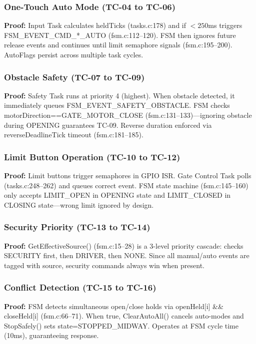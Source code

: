 \documentclass[11pt,a4paper]{article}
\begin{document}
\subsubsection{One-Touch Auto Mode (TC-04 to TC-06)}

\textbf{Proof:} Input Task calculates heldTicks (tasks.c:178) and if $< 250$ms triggers FSM\_EVENT\_CMD\_*\_AUTO (fsm.c:112--120). FSM then ignores future release events and continues until limit semaphore signals (fsm.c:195--200). AutoFlags persist across multiple task cycles.

\subsubsection{Obstacle Safety (TC-07 to TC-09)}

\textbf{Proof:} Safety Task runs at priority 4 (highest). When obstacle detected, it immediately queues FSM\_EVENT\_SAFETY\_OBSTACLE. FSM checks motorDirection==GATE\_MOTOR\_CLOSE (fsm.c:131--133)---ignoring obstacle during OPENING guarantees TC-09. Reverse duration enforced via reverseDeadlineTick timeout (fsm.c:181--185).

\subsubsection{Limit Button Operation (TC-10 to TC-12)}

\textbf{Proof:} Limit buttons trigger semaphores in GPIO ISR. Gate Control Task polls (tasks.c:248--262) and queues correct event. FSM state machine (fsm.c:145--160) only accepts LIMIT\_OPEN in OPENING state and LIMIT\_CLOSED in CLOSING state---wrong limit ignored by design.

\subsubsection{Security Priority (TC-13 to TC-14)}

\textbf{Proof:} GetEffectiveSource() (fsm.c:15--28) is a 3-level priority cascade: checks SECURITY first, then DRIVER, then NONE. Since all manual/auto events are tagged with source, security commands always win when present.

\subsubsection{Conflict Detection (TC-15 to TC-16)}

\textbf{Proof:} FSM detects simultaneous open/close holds via openHeld[i] \&\& closeHeld[i] (fsm.c:66--71). When true, ClearAutoAll() cancels auto-modes and StopSafely() sets state=STOPPED\_MIDWAY. Operates at FSM cycle time (10ms), guaranteeing response.
\end{document}
